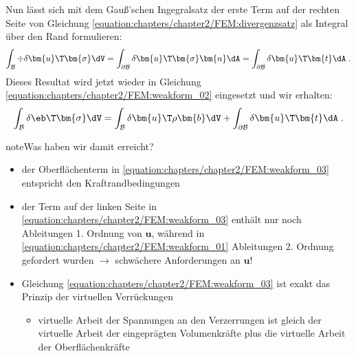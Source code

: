 \documentclass[letterpaper,10pt,german]{jupyterBook}
\begin{document}
\sphinxAtStartPar
Nun lässt sich mit dem Gauß’schen Ingegralsatz der erste Term auf der rechten Seite von Gleichung \eqref{equation:chapters/chapter2/FEM:divergenzsatz} als Integral über den Rand formulieren:
\begin{equation}\label{equation:chapters/chapter2/FEM:gaussIntegralTheorem}
\begin{split}\int_{\mathcal{B}} \div{\delta \bm{u}\T  \bm{\sigma}} \dV = \int_{\partial\mathcal{B}} \delta \bm{u}\T \bm{\sigma}  \bm{n} \dA = \int_{\partial\mathcal{B}} \delta \bm{u}\T \bm{t} \dA \; . \end{split}
\end{equation}
\sphinxAtStartPar
Dieses Resultat wird jetzt wieder in Gleichung \eqref{equation:chapters/chapter2/FEM:weakform_02} eingesetzt und wir erhalten:
\begin{equation}\label{equation:chapters/chapter2/FEM:weakform_03}
\begin{split}\int_{\mathcal{B}} \delta\eb\T  \bm{\sigma} \dV = \int_{\mathcal{B}} \delta \bm{u}\T \rho \bm{b} \dV + \int_{\partial\mathcal{B}} \delta \bm{u}\T  \bm{t} \dA \; .\end{split}
\end{equation}
\begin{sphinxadmonition}{note}{Was haben wir damit erreicht?}
\begin{itemize}
\item {} 
\sphinxAtStartPar
der Oberflächenterm in \eqref{equation:chapters/chapter2/FEM:weakform_03} entspricht den Kraftrandbedingungen

\item {} 
\sphinxAtStartPar
der Term auf der linken Seite in \eqref{equation:chapters/chapter2/FEM:weakform_03} enthält nur noch Ableitungen 1. Ordnung von \(\bm{u}\), während in \eqref{equation:chapters/chapter2/FEM:weakform_01} Ableitungen 2. Ordnung gefordert wurden \(\rightarrow\) schwächere Anforderungen an \(\bm{u}\)!

\item {} 
\sphinxAtStartPar
Gleichung \eqref{equation:chapters/chapter2/FEM:weakform_03} ist exakt das Prinzip der virtuellen Verrückungen
\begin{itemize}
\item {} 
\sphinxAtStartPar
virtuelle Arbeit der Spannungen an den Verzerrungen ist gleich der virtuelle Arbeit der eingeprägten Volumenkräfte plus die virtuelle Arbeit der Oberflächenkräfte

\end{itemize}

\end{itemize}
\end{sphinxadmonition}
\end{document}
